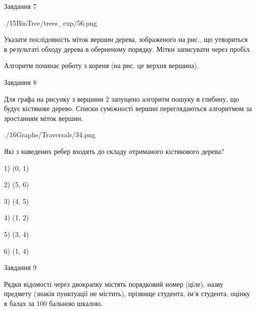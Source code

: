 \documentclass[12pt, ukrainian]{article}
\begin{document}
{\vspace{10mm}\par

\newpage
\begin{minipage}[t]{9.7cm}
               
{\begin{center}Завдання {7}\end{center}}
\vspace{-6mm}

\begin{center}
	{./15BinTree/trees_exp/56.png}
\end{center}
Указати послідовність міток вершин дерева, зображеного на рис., що утвориться в результаті обходу дерева в оберненому порядку. Мітки записувати через пробіл.\par Алгоритм починає роботу з кореня (на рис. це верхня вершина).\par

\end{minipage}
\vline \hspace{8mm}
\begin{minipage}[t]{8.0cm}
               
{\begin{center}Завдання {8}\end{center}}
\vspace{-6mm}
Для графа на рисунку з вершини 2 запущено алгоритм пошуку в глибину, що будує кістякове дерево. Списки суміжності вершин переглядаються алгоритмом за зростанням міток вершин.\par
\begin{center}
	{./16Graphs/Traversals/34.png}
\end{center}
\par Які з наведених ребер входять до складу отриманого кістякового дерева?\par
1) (0, 1)\par
2) (5, 6)\par
3) (4, 5)\par
4) (1, 2)\par
5) (3, 4)\par
6) (1, 4)\par
{\vskip 15pt} \par

\end{minipage}

               
{\begin{center}Завдання {9}\end{center}}
\vspace{-6mm}
Рядки відомості через двокрапку містять порядковий номер (ціле), назву предмету (знаків пунктуації не містить), прізвище студента, ім'я студента, оцінку в балах за 100 бальною шкалою.

}
\end{document}
